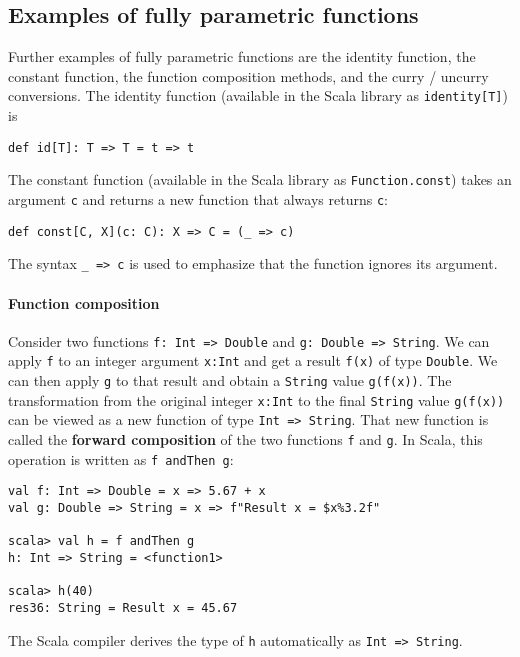 \subsection{Examples of fully parametric functions\label{subsec:Examples-of-fully-parametric}}

Further examples of fully parametric functions are the identity function,
the constant function, the function composition methods, and the curry
/ uncurry conversions. The identity function
(available in the Scala library as \lstinline!identity[T]!) is
\begin{lstlisting}
def id[T]: T => T = t => t
\end{lstlisting}
The constant function (available in the
Scala library as \lstinline!Function.const!) takes an argument \lstinline!c!
and returns a new function that always returns \lstinline!c!:
\begin{lstlisting}
def const[C, X](c: C): X => C = (_ => c)
\end{lstlisting}
The syntax \lstinline!_ => c! is used to emphasize that the function
ignores its argument.

\paragraph{Function composition}

Consider two functions \lstinline!f: Int => Double!
and \lstinline!g: Double => String!. We can apply \lstinline!f!
to an integer argument \lstinline!x:Int! and get a result \lstinline!f(x)!
of type \lstinline!Double!. We can then apply \lstinline!g! to that
result and obtain a \lstinline!String! value \lstinline!g(f(x))!.
The transformation from the original integer \lstinline!x:Int! to
the final \lstinline!String! value \lstinline!g(f(x))! can be viewed
as a new function of type \lstinline!Int => String!. That new function
is called the \textbf{forward composition}
of the two functions \lstinline!f! and \lstinline!g!. In Scala,
this operation is written as \lstinline!f andThen g!:
\begin{lstlisting}
val f: Int => Double = x => 5.67 + x
val g: Double => String = x => f"Result x = $x%3.2f"

scala> val h = f andThen g
h: Int => String = <function1>

scala> h(40)
res36: String = Result x = 45.67
\end{lstlisting}
The Scala compiler derives the type of \lstinline!h! automatically
as \lstinline!Int => String!.

